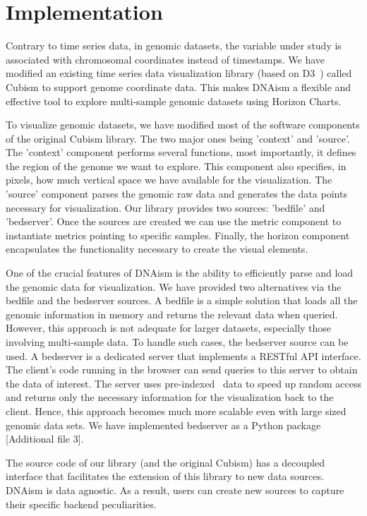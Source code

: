 \documentclass[twocolumn]{bmcart}
\begin{document}
\section*{Implementation}

Contrary to time series data, in genomic datasets, the variable under study is
associated with chromosomal coordinates instead of timestamps. We have modified
an existing time series data visualization library (based on D3~\cite{2011-d3})
called Cubism to support genome coordinate data. This makes DNAism
a flexible and effective tool to explore multi-sample genomic datasets using
Horizon Charts.

To visualize genomic datasets, we have modified most of the software components
of the original Cubism library.  The two major ones being 'context' and
'source'.  The 'context' component performs several functions, most
importantly, it defines the region of the genome we want to explore. This
component also specifies, in pixels, how much vertical space we have available
for the visualization.  The 'source' component parses the genomic raw data and
generates the data points necessary for visualization. Our library provides two
sources: 'bedfile' and 'bedserver'. Once the sources are created we can use the
metric component to instantiate metrics pointing to specific samples.  Finally,
the horizon component encapsulates the functionality necessary to create the
visual elements.

One of the crucial features of DNAism is the ability to efficiently parse and
load the genomic data for visualization. We have provided two alternatives via
the bedfile and the bedserver sources. A bedfile is a simple solution that
loads all the genomic information  in memory and returns the relevant data when
queried.  However, this approach is not adequate for larger datasets,
especially those involving multi-sample data. To handle such cases, the
bedserver source can be used. A bedserver is a dedicated server that implements
a RESTful API interface. The client's code running in the browser can send
queries to this server to obtain the data of interest.  The server uses
pre-indexed~\cite{tabix-li} data to speed up random access and returns only the
necessary information for the visualization back to the client.  Hence, this
approach becomes much more scalable even with large sized genomic data sets. We
have implemented bedserver as a Python package [Additional file 3].

The source code of our library (and the original Cubism) has a decoupled
interface that facilitates the extension of this library to new data sources.
DNAism is data agnostic. As a result, users can create new sources to capture
their specific backend peculiarities.
\end{document}
